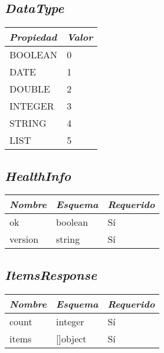 \subsection{\textit{DataType}}
\begin{table}[H]
    \centering
    \def\arraystretch{1.25}
    \begin{adjustbox}{max width=\textwidth}
    \begin{tabularx}{\textwidth}{|L|l|}
    \hline
        \textbf{\textit{Propiedad}} & \textbf{\textit{Valor}} \\ \hline
    \hline
        BOOLEAN & 0 \\ \hline
        DATE & 1 \\ \hline
        DOUBLE & 2 \\ \hline
        INTEGER & 3 \\ \hline
        STRING & 4 \\ \hline
        LIST & 5 \\ \hline
    \end{tabularx}
    \end{adjustbox}
\end{table}

\subsection{\textit{HealthInfo}}
\begin{table}[H]
    \centering
    \def\arraystretch{1.25}
    \begin{adjustbox}{max width=\textwidth}
    \begin{tabularx}{\textwidth}{|L|l|l|}
    \hline
        \textbf{\textit{Nombre}} & \textbf{\textit{Esquema}} & \textbf{\textit{Requerido}} \\ \hline
    \hline
        ok & boolean & Sí \\ \hline
        version & string & Sí \\ \hline
    \end{tabularx}
    \end{adjustbox}
\end{table}

\subsection{\textit{ItemsResponse}}
\begin{table}[H]
    \centering
    \def\arraystretch{1.25}
    \begin{adjustbox}{max width=\textwidth}
    \begin{tabularx}{\textwidth}{|L|l|l|}
    \hline
        \textbf{\textit{Nombre}} & \textbf{\textit{Esquema}} & \textbf{\textit{Requerido}} \\ \hline
    \hline
        count & integer & Sí \\ \hline
        items & []object & Sí \\ \hline
    \end{tabularx}
    \end{adjustbox}
\end{table}


